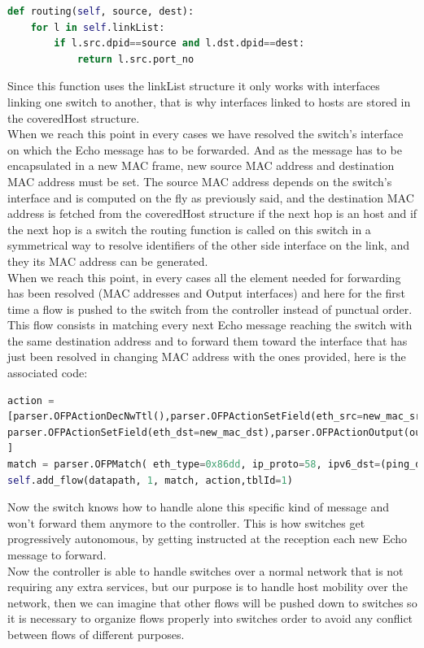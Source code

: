 \documentclass{article}
\begin{document}
\begin{lstlisting}[frame=single,language=Python, breaklines=true] 
def routing(self, source, dest):
    for l in self.linkList:
        if l.src.dpid==source and l.dst.dpid==dest:
            return l.src.port_no
\end{lstlisting}

Since this function uses the linkList structure it only works with
interfaces linking one switch to another, that is why interfaces
linked to hosts are stored in the coveredHost structure.\\
\newline
When we reach this point in every cases we have resolved the switch's
interface on which the Echo message has to be forwarded. And as the
message has to be encapsulated in a new MAC frame, new source MAC
address and destination MAC address must be set. The source MAC
address depends on the switch's interface and is computed on the fly
as previously said, and the destination MAC address is fetched from
the coveredHost structure if the next hop is an host and if the next
hop is a switch the routing function is called on this switch in a
symmetrical way to resolve identifiers of the other side interface on
the link, and they its MAC address can be generated.\\
\newline
When we reach this point, in every cases all the element needed for
forwarding has been resolved (MAC addresses and Output interfaces) and
here for the first time a flow is pushed to the switch from the
controller instead of punctual order. This flow consists in matching
every next Echo message reaching the switch with the same destination
address and to forward them toward the interface that has just been
resolved in changing MAC address with the ones provided, here is the
associated code:

\begin{lstlisting}[frame=single,language=Python, breaklines=true] 
action =
[parser.OFPActionDecNwTtl(),parser.OFPActionSetField(eth_src=new_mac_src),
parser.OFPActionSetField(eth_dst=new_mac_dst),parser.OFPActionOutput(outputIntf)
]
match = parser.OFPMatch( eth_type=0x86dd, ip_proto=58, ipv6_dst=(ping_dst,'ffff:ffff:ffff:ffff:ffff:ffff:ffff:ffff'))
self.add_flow(datapath, 1, match, action,tblId=1)
\end{lstlisting}

Now the switch knows how to handle alone this specific kind of message
and won't forward them anymore to the controller. This is how switches
get progressively autonomous, by getting instructed at the reception
each new Echo message to forward.\\
\newline
Now the controller is able to handle switches over a normal network
that is not requiring any extra services, but our purpose is to handle
host mobility over the network, then we can imagine that other flows
will be pushed down to switches so it is necessary to organize flows
properly into switches order to avoid any conflict between flows of
different purposes.
\end{document}
